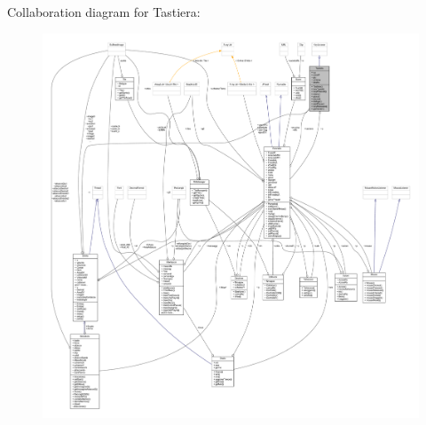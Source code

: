 Collaboration diagram for Tastiera\+:
\nopagebreak
\begin{figure}[H]
\begin{center}
\leavevmode
\includegraphics[width=350pt]{classa_1_1survival_1_1game_1_1_tastiera__coll__graph}
\end{center}
\end{figure}
